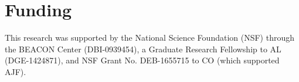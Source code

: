 
\section*{Funding}


This research was supported by the National Science Foundation (NSF) through the BEACON Center (DBI-0939454), a Graduate Research Fellowship to AL (DGE-1424871), and NSF Grant No. DEB-1655715 to CO (which supported AJF). 

